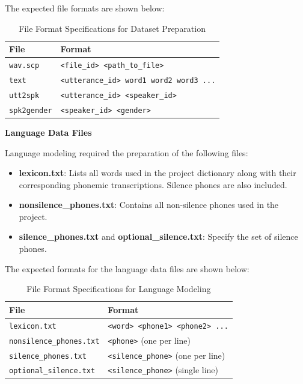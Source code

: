 \vspace{1em}

The expected file formats are shown below:

\begin{table}[H]
\centering
\renewcommand{\arraystretch}{1.3}
\setlength{\tabcolsep}{10pt}
\caption{File Format Specifications for Dataset Preparation}
\label{tab:fileformats}
\begin{tabular}{|l|l|}
\hline
\textbf{File} & \textbf{Format} \\
\hline
\texttt{wav.scp} & \texttt{<file\_id> <path\_to\_file>} \\
\texttt{text} & \texttt{<utterance\_id> word1 word2 word3 ...} \\
\texttt{utt2spk} & \texttt{<utterance\_id> <speaker\_id>} \\
\texttt{spk2gender} & \texttt{<speaker\_id> <gender>} \\
\hline
\end{tabular}
\end{table}

\textbf{Language Data Files}

Language modeling required the preparation of the following files:

\begin{itemize}
    \item \textbf{lexicon.txt}: Lists all words used in the project dictionary along with their corresponding phonemic transcriptions. Silence phones are also included.
    \item \textbf{nonsilence\_phones.txt}: Contains all non-silence phones used in the project.
    \item \textbf{silence\_phones.txt} and \textbf{optional\_silence.txt}: Specify the set of silence phones.
\end{itemize}

\vspace{1em}

The expected formats for the language data files are shown below:

\begin{table}[H]
\centering
\renewcommand{\arraystretch}{1.3}
\setlength{\tabcolsep}{10pt}
\caption{File Format Specifications for Language Modeling}
\label{tab:languageformats}
\begin{tabular}{|l|l|}
\hline
\textbf{File} & \textbf{Format} \\
\hline
\texttt{lexicon.txt} & \texttt{<word> <phone1> <phone2> ...} \\
\texttt{nonsilence\_phones.txt} & \texttt{<phone>} (one per line) \\
\texttt{silence\_phones.txt} & \texttt{<silence\_phone>} (one per line) \\
\texttt{optional\_silence.txt} & \texttt{<silence\_phone>} (single line) \\
\hline
\end{tabular}
\end{table}

